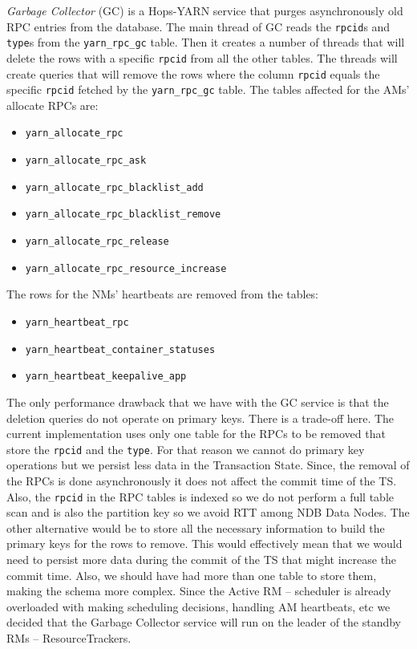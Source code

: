 \emph{Garbage Collector} (GC) is a Hops-YARN service that purges
asynchronously old RPC entries from the database. The main thread of
GC reads the \texttt{rpcid}s and \texttt{type}s from the
\texttt{yarn\_rpc\_gc} table. Then it creates a number of threads that
will delete the rows with a specific \texttt{rpcid} from all the other
tables. The threads will create
queries that will remove the rows where the column \texttt{rpcid}
equals the specific \texttt{rpcid} fetched by the
\texttt{yarn\_rpc\_gc} table. The tables affected for the AMs'
allocate RPCs are:
\begin{itemize}
\item \texttt{yarn\_allocate\_rpc}
\item \texttt{yarn\_allocate\_rpc\_ask}
\item \texttt{yarn\_allocate\_rpc\_blacklist\_add}
\item \texttt{yarn\_allocate\_rpc\_blacklist\_remove}
\item \texttt{yarn\_allocate\_rpc\_release}
\item \texttt{yarn\_allocate\_rpc\_resource\_increase}
\end{itemize}

The rows for the NMs' heartbeats are removed from the tables:
\begin{itemize}
\item \texttt{yarn\_heartbeat\_rpc}
\item \texttt{yarn\_heartbeat\_container\_statuses}
\item \texttt{yarn\_heartbeat\_keepalive\_app}
\end{itemize}

The only performance drawback that we have with the GC service is that
the deletion queries do not operate on primary keys. There is a
trade-off here. The current implementation uses only one table for the
RPCs to be removed that store the \texttt{rpcid} and the
\texttt{type}. For that reason we cannot do primary key operations but
we persist less data in the Transaction State. Since, the removal of
the RPCs is done asynchronously it does not affect the commit time
of the TS. Also, the \texttt{rpcid} in the RPC tables is indexed so we
do not perform a full table scan and is also the partition key so we avoid RTT
among NDB Data Nodes. The other alternative would be to
store all the necessary information to build the primary keys for the
rows to remove. This would effectively mean that we would need to persist more
data during the commit of the TS that might increase the commit
time. Also, we should have had more than one table to store them,
making the schema more complex. Since the Active RM -- scheduler is
already overloaded with making scheduling decisions, handling AM
heartbeats, etc we decided that the Garbage Collector service will run on
the leader of the standby RMs -- ResourceTrackers.

